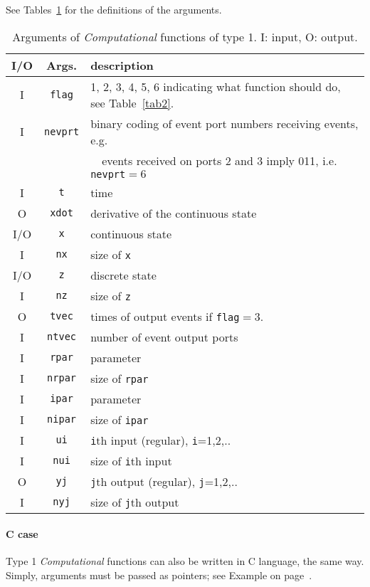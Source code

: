 \documentclass{book}
\newcommand{\computational}{{\em Computational }}
\begin{document}
See Tables~\ref{tab11} for the definitions of the arguments.
\begin{table}[ht]
\begin{center}
\begin{tabular}{|c|c|l|} \hline
I/O&Args.&description \\ \hline
I&  {\tt flag}& 1, 2, 3, 4, 5, 6 indicating what function
should do, see Table~\ref{tab2}.\\
I& {\tt nevprt}& binary coding of event port numbers 
receiving events, e.g. \\
&&~~events received on ports 2 and 3
imply 011, i.e. {\tt nevprt}$=6$\\
I& {\tt t}& time\\
O& {\tt xdot}& derivative of the continuous state \\
I/O& {\tt x}& continuous state\\
I& {\tt nx}& size of {\tt x}\\
I/O& {\tt z}& discrete state\\
I& {\tt nz}& size of {\tt z}\\
O& {\tt tvec}& times of output events if
      {\tt flag}$=$3. \\
I& {\tt ntvec}& number of event output ports\\
I& {\tt rpar}& parameter\\
I& {\tt nrpar}& size of {\tt rpar}\\
I& {\tt ipar}& parameter\\
I& {\tt nipar}& size of {\tt ipar}\\
I& {\tt ui}& {\tt i}th input (regular), {\tt i}=1,2,..\\
I& {\tt nui} & size of {\tt i}th input \\
O& {\tt yj}& {\tt j}th output (regular), {\tt j}=1,2,..\\
I& {\tt nyj}& size of {\tt j}th output \\ \hline
\end{tabular}
\caption{Arguments of \computational functions of type 1. I: input, O:
output.}
\label{tab11}
\end{center}
\end{table}

\paragraph{C case}
Type 1 \computational functions can also be written in C language,
the same way. Simply, arguments must be passed as pointers;
see Example on page~\pageref{exc}.
\end{document}
